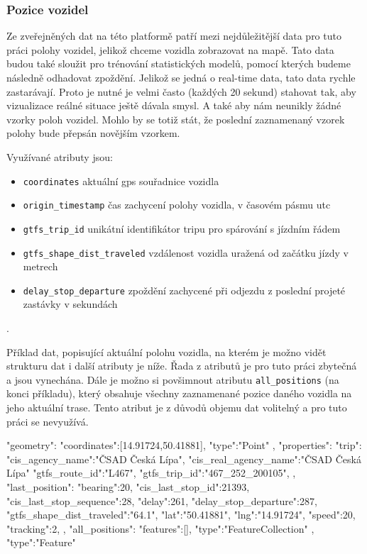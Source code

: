 \subsubsection{Pozice vozidel}

Ze zveřejněných dat na této platformě patří mezi nejdůležitější data pro tuto práci polohy vozidel, jelikož chceme vozidla zobrazovat na mapě. Tato data budou také sloužit pro trénování statistických modelů, pomocí kterých budeme následně odhadovat zpoždění. Jelikož se jedná o real-time data, tato data rychle zastarávají. Proto je nutné je velmi často (každých 20 sekund) stahovat tak, aby vizualizace reálné situace ještě dávala smysl. A také aby nám neunikly žádné vzorky poloh vozidel. Mohlo by se totiž stát, že poslední zaznamenaný vzorek polohy bude přepsán novějším vzorkem.

\bigbreak

Využívané atributy jsou:

\begin{itemize}
	\item \verb-coordinates- aktuální \gls{gps} souřadnice vozidla

	\item \verb-origin_timestamp- čas zachycení polohy vozidla, v časovém pásmu \gls{utc}

	\item \verb-gtfs_trip_id- unikátní identifikátor tripu pro spárování s jízdním řádem

	\item \verb-gtfs_shape_dist_traveled- vzdálenost vozidla uražená od začátku jízdy v metrech

	\item \verb-delay_stop_departure- zpoždění zachycené při odjezdu z poslední projeté zastávky v sekundách
\end{itemize}.

Příklad dat, popisující aktuální polohu vozidla, na kterém je možno vidět strukturu dat i další atributy je níže. Řada z atributů je pro tuto práci zbytečná a jsou vynechána. Dále je možno si povšimnout atributu \verb-all_positions- (na konci příkladu), který obsahuje všechny zaznamenané pozice daného vozidla na jeho aktuální trase. Tento atribut je z důvodů objemu dat volitelný a pro tuto práci se nevyužívá.

\begin{code}[frame=none]
"geometry":{
  "coordinates":[14.91724,50.41881],
  "type":"Point"
},
"properties":{
  "trip":{
    "cis_agency_name":"ČSAD Česká Lípa",
	"cis_real_agency_name":"ČSAD Česká Lípa"
	"gtfs_route_id":"L467",
	"gtfs_trip_id":"467_252_200105",
  },
  "last_position":{
    "bearing":20,
	"cis_last_stop_id":21393,
	"cis_last_stop_sequence":28,
	"delay":261,
	"delay_stop_departure":287,
	"gtfs_shape_dist_traveled":"64.1",
	"lat":"50.41881",
	"lng":"14.91724",
	"speed":20,
	"tracking":2,
	},
  "all_positions":{
    "features":[],
	"type":"FeatureCollection"
  }
},
"type":"Feature"

\end{code}

